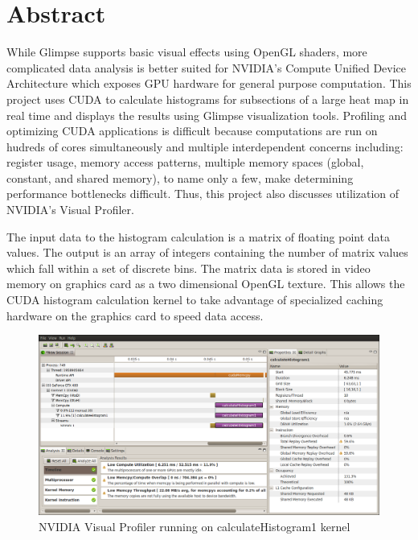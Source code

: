 \documentclass{article}
\begin{document}
\section{Abstract}\label{abstract}

While Glimpse supports basic visual effects using OpenGL shaders, more complicated data analysis is better suited for NVIDIA's Compute Unified Device Architecture\cite{cuda-zone} which exposes GPU hardware for general purpose computation. This project uses CUDA to calculate histograms for subsections of a large heat map in real time and displays the results using Glimpse visualization tools. Profiling and optimizing CUDA applications is difficult because computations are run on hudreds of cores simultaneously and multiple interdependent concerns including: register usage, memory access patterns, multiple memory spaces (global, constant, and shared memory), to name only a few, make determining performance bottlenecks difficult. Thus, this project also discusses utilization of NVIDIA's Visual Profiler\cite{nvidia-visual-profiler}.

The input data to the histogram calculation is a matrix of floating point data values. The output is an array of integers containing the number of matrix values which fall within a set of discrete bins. The matrix data is stored in video memory on graphics card as a two dimensional OpenGL texture. This allows the CUDA histogram calculation kernel to take advantage of specialized caching hardware on the graphics card to speed data access.

\begin{figure}
\centering
\includegraphics[width=1.0\textwidth]{screenshots/nvvp/calculateHistogram1_screen1.png}
\caption{NVIDIA Visual Profiler running on calculateHistogram1 kernel}
\label{kernel1nvvp1}
\end{figure}
\end{document}
